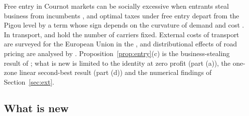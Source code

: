 \documentclass[preprint,11pt,authoryear]{elsarticle}
\theoremstyle{plain}
\theoremstyle{remark}
\begin{document}
Free entry in Cournot markets can be socially excessive when entrants steal business from incumbents \citep{MankiwWhinston1986}, and optimal taxes under free entry depart from the Pigou level by a term whose sign depends on the curvature of demand and cost \citep{Konishi1990,KatsoulacosXepapadeas1995,Hamada2022}. In transport, \citet{Brueckner2002} and \citet{PelsVerhoef2004} hold the number of carriers fixed. External costs of transport are surveyed for the European Union in the \citet{Handbook2019}, and distributional effects of road pricing are analysed by \citet{EliassonMattsson2006}. Proposition~\ref{prop:entry}(c) is the business-stealing result of \citeauthor{MankiwWhinston1986}; what is new is limited to the identity at zero profit (part (a)), the one-zone linear second-best result (part (d)) and the numerical findings of Section~\ref{sec:ext}.

\subsection{What is new}\label{sec:rw-new}
\end{document}
